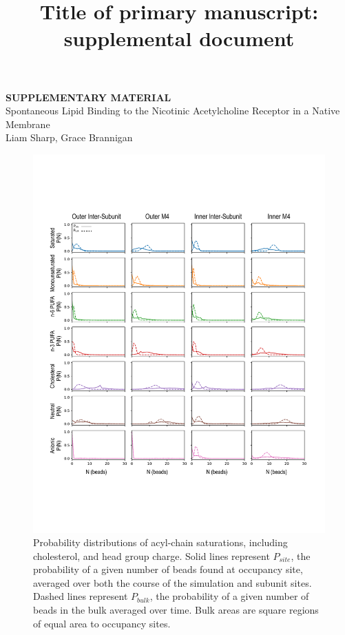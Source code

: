 \documentclass[9pt]{article}
\title{Title of primary manuscript: supplemental document}
\begin{document}
\begin{titlepage}
   \begin{center}
      \huge\textbf{SUPPLEMENTARY MATERIAL}\\
      \LARGE{Spontaneous Lipid Binding to the Nicotinic Acetylcholine Receptor in a Native Membrane}\\
      
      
      Liam Sharp, Grace Brannigan
   \end{center}
   
\end{titlepage}

\renewcommand{\thefigure}{SI 1}
\begin{figure}[!h]
	\center
	\includegraphics[width=\linewidth]{../Figures/Bead_Distributions.pdf}
	\caption{Probability distributions of acyl-chain saturations, including cholesterol, and head group charge. Solid lines represent $P_{site}$, the probability of a given number of beads found at occupancy site, averaged over both the course of the simulation and subunit sites. Dashed lines represent  $P_{bulk}$, the probability of a given number of beads in the bulk averaged over time. Bulk areas are square regions of equal area to occupancy sites.}
	\label{fig:lipidDist}
\end{figure}
\end{document}
